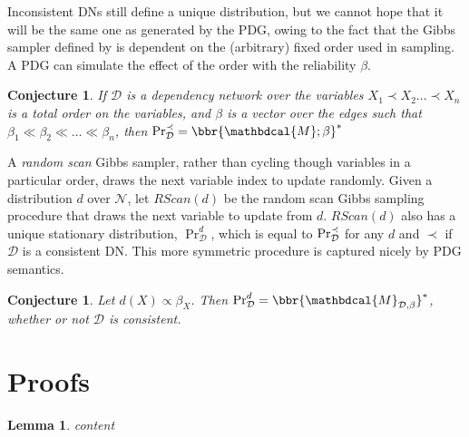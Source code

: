 \documentclass[letterpaper]{article} %
\theoremstyle{plain}
\newtheorem{lemma}[theorem]{Lemma}
\newtheorem{conj}[theorem]{Conjecture}
\theoremstyle{definition}
\theoremstyle{remark}
\newcommand{\dg}[1]{\mathbdcal{#1}}
\newcommand{\N}{\mathcal N}
\newcommand{\PDGof}[1]{{\dg M}_{#1}}
\begin{document}
Inconsistent DNs still define a unique distribution, but we cannot hope that it 
will be the same one as generated by the PDG, owing to the fact that
the Gibbs sampler defined by \citeauthor{heckerman2000dependency} is dependent
on the (arbitrary) fixed order used in sampling.
A PDG can simulate the effect of the order with the reliability $\beta$.

\begin{conj}
If $\mathcal D$ is a dependency network over the variables
$X_1 \prec X_2  \ldots  \prec X_n$ is a total order on the variables, and $\beta$ is a vector over the edges
such that  $\beta_1 \ll\beta_2 \ll \ldots \ll \beta_n$, 
then $\Pr_{\cal D}^{\prec} = \bbr{\dg M; \beta}^*$
\end{conj}

A \emph{random scan} Gibbs sampler, rather than cycling though variables in a 
particular order, draws the next variable index to update randomly.
Given a distribution $d$ over $\N$,
let $\mathit{RScan}(d)$ be the random scan Gibbs sampling procedure that draws
the next variable to update from $d$. $\mathit{RScan}(d)$ also has a unique stationary distribution, $\Pr_{\mathcal D}^d$, which is equal to $\Pr_{\cal D}^{\prec}$ for any $d$ and $\prec$ if $\mathcal D$ is a consistent DN. This more symmetric procedure is captured nicely by PDG semantics.

\begin{conj}\label{thm:dns-are-completely-pdgs}
	Let $d(X) \propto \beta_X$. Then
	$\Pr_{\mathcal D}^d = \bbr{\PDGof{\mathcal D, \beta}}^*$, whether or not $\mathcal D$ is consistent.
\end{conj}


\appendix
\clearpage
\onecolumn
\section{Proofs}
\begin{lemma}
	content
\end{lemma}
\end{document}
